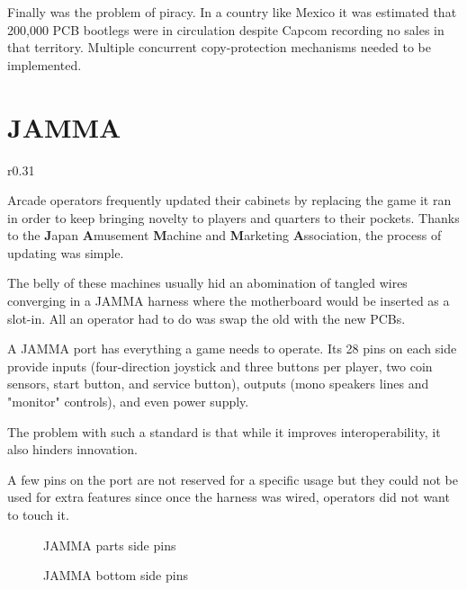 Finally was the problem of piracy. In a country like Mexico it was estimated that 200,000 PCB bootlegs were in circulation\cite{sf2_oral_history} despite Capcom recording no sales in that territory. Multiple concurrent copy-protection mechanisms needed to be implemented.



\section{JAMMA}



\begin{wrapfigure}[20]{r}{0.31\textwidth}
\vspace{-\baselineskip}
\centering
\end{wrapfigure}


Arcade operators frequently updated their cabinets by replacing the game it ran in order to keep bringing novelty to players and quarters to their pockets. Thanks to the \textbf{J}apan \textbf{A}musement \textbf{M}achine and \textbf{M}arketing \textbf{A}ssociation, the process of updating was simple. 

The belly of these machines usually hid an abomination of tangled wires converging in a JAMMA harness where the motherboard would be inserted as a slot-in. All an operator had to do was swap the old with the new PCBs.

A JAMMA port has everything a game needs to operate. Its 28 pins on each side provide inputs (four-direction joystick and three buttons per player, two coin sensors, start button, and service button), outputs (mono speakers lines and "monitor" controls), and even power supply.

The problem with such a standard is that while it improves interoperability, it also hinders innovation. 

A few pins on the port are not reserved for a specific usage but they could not be used for extra features since once the harness was wired, operators did not want to touch it.



 \begin{figure}[H]
\caption*{JAMMA parts side pins}
\end{figure}

 \begin{figure}[H]
\caption*{JAMMA bottom side pins}
\end{figure}



